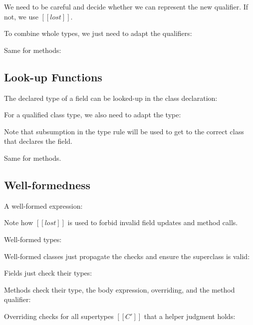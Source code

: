 \documentclass[final,10pt,twoside]{article}
\begin{document}
We need to be careful and decide whether we can represent the new
qualifier. If not, we use $[[lost]]$.

\ottdefnqcombqrules


To combine whole types, we just need to adapt the qualifiers:

\ottdefnqcombtrules


Same for methods:

\ottdefnqcombmsrules



\subsection{Look-up Functions}

The declared type of a field can be looked-up in the class
declaration:

\ottdefnsftypec


For a qualified class type, we also need to adapt the type:

\ottdefnsftypet


Note that subsumption in the type rule will be used to get to the
correct class that declares the field.

Same for methods.

\ottdefnsmsigc


\ottdefnsmsigt


\subsection{Well-formedness}

A well-formed expression:

\ottdefntyperules


Note how $[[lost]]$ is used to forbid invalid field updates and method
calls.


Well-formed types:

\ottdefnwftype


Well-formed classes just propagate the checks and ensure the
superclass is valid:

\ottdefnwfclass


Fields just check their types:

\ottdefnwffd


Methods check their type, the body expression, overriding, and the
method qualifier:

\ottdefnwfmd


Overriding checks for all supertypes $[[C']]$ that a helper judgment
holds:
\end{document}
